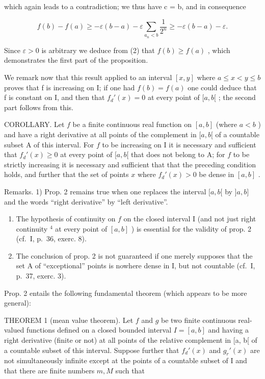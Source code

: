 which again leads to a contradiction; we thus have c = b, and in consequence

\[
f (b) - f (a) \geqslant - \varepsilon (b - a) - \varepsilon \sum_ {a _ {n} <   b} \frac {1}{2 ^ {n}} \geqslant - \varepsilon (b - a) - \varepsilon .\tag{2}
\]

Since \(\varepsilon > 0\) is arbitrary we deduce from (2) that \(f(b) \geqslant f(a)\) , which demonstrates the first part of the proposition.

We remark now that this result applied to an interval \([x, y]\) where \(a \leqslant x < y \leqslant b\) proves that f is increasing on I; if one had \(f(b) = f(a)\) one could deduce that f is constant on I, and then that \(f_{d}'(x) = 0\) at every point of \([a, b[\) ; the second part follows from this.

COROLLARY. Let \(f\) be a finite continuous real function on \([a, b]\) (where \(a < b\) ) and have a right derivative at all points of the complement in \([a, b[\) of a countable subset A of this interval. For \(f\) to be increasing on I it is necessary and sufficient that \(f_d'(x) \geqslant 0\) at every point of \([a, b[\) that does not belong to A; for \(f\) to be strictly increasing it is necessary and sufficient that that the preceding condition holds, and further that the set of points \(x\) where \(f_d'(x) > 0\) be dense in \([a, b]\) .

Remarks. 1) Prop. 2 remains true when one replaces the interval \([a, b[\) by \(]a, b]\) and the words ``right derivative'' by ``left derivative''.

\begin{enumerate}
\def\labelenumi{\arabic{enumi})}
\setcounter{enumi}{1}
\item
  The hypothesis of continuity on \(f\) on the closed interval I (and not just right continuity \(^{4}\) at every point of \([a, b]\) ) is essential for the validity of prop. 2 (cf.~I, p.~36, exerc. 8).
\item
  The conclusion of prop. 2 is not guaranteed if one merely supposes that the set A of ``exceptional'' points is nowhere dense in I, but not countable (cf.~I, p.~37, exerc. 3).
\end{enumerate}

Prop. 2 entails the following fundamental theorem (which appears to be more general):

THEOREM 1 (mean value theorem). Let \(f\) and \(g\) be two finite continuous real-valued functions defined on a closed bounded interval \(I = [a, b]\) and having a right derivative (finite or not) at all points of the relative complement in {[}a, b{[} of a countable subset of this interval. Suppose further that \(f_d'(x)\) and \(g_r'(x)\) are not simultaneously infinite except at the points of a countable subset of I and that there are finite numbers \(m, M\) such that

